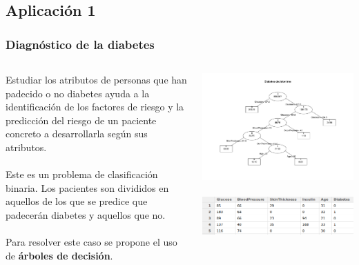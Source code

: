 \documentclass[8pt]{beamer}
\begin{document}
  \subsection{Aplicación 1}
    \begin{frame}
      \frametitle{Diagnóstico de la diabetes}
      \begin{columns}[c]
       \begin{column}{.5\textwidth}
	 \justifying
	 Estudiar los atributos de personas que han padecido o no diabetes ayuda a
         la identificación de los factores de riesgo y la
         predicción del riesgo de un paciente concreto a desarrollarla según sus atributos.
         \\~\\
         Este es un problema de clasificación binaria. Los pacientes son divididos en aquellos
         de los que se predice que padecerán diabetes y aquellos que no.
         \\~\\
         Para resolver este caso se propone el uso de \textbf{árboles de decisión}. 
         
       \end{column}
       \begin{column}{.5\textwidth}
	  \begin{center}
	  \includegraphics[width=\textwidth]{imgs/tree.pdf} %
	  \\~\\
	  \includegraphics[width=\textwidth]{imgs/pima-indians-diabetes.png} %

	  \end{center}
       \end{column}
      \end{columns}
    \end{frame}
    
\end{document}
